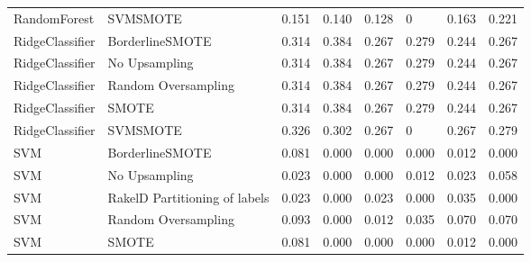 \begin{tabular}{llllllll}
                   RandomForest &                      SVMSMOTE & 0.151 &                     0.140 &                 0.128 &                      0 &                                   0.163 &     0.221 \\
                RidgeClassifier &               BorderlineSMOTE & 0.314 &                     0.384 &                 0.267 &                  0.279 &                                   0.244 &     0.267 \\
                RidgeClassifier &                 No Upsampling & 0.314 &                     0.384 &                 0.267 &                  0.279 &                                   0.244 &     0.267 \\
                RidgeClassifier &           Random Oversampling & 0.314 &                     0.384 &                 0.267 &                  0.279 &                                   0.244 &     0.267 \\
                RidgeClassifier &                         SMOTE & 0.314 &                     0.384 &                 0.267 &                  0.279 &                                   0.244 &     0.267 \\
                RidgeClassifier &                      SVMSMOTE & 0.326 &                     0.302 &                 0.267 &                      0 &                                   0.267 &     0.279 \\
                            SVM &               BorderlineSMOTE & 0.081 &                     0.000 &                 0.000 &                  0.000 &                                   0.012 &     0.000 \\
                            SVM &                 No Upsampling & 0.023 &                     0.000 &                 0.000 &                  0.012 &                                   0.023 &     0.058 \\
                            SVM & RakelD Partitioning of labels & 0.023 &                     0.000 &                 0.023 &                  0.000 &                                   0.035 &     0.000 \\
                            SVM &           Random Oversampling & 0.093 &                     0.000 &                 0.012 &                  0.035 &                                   0.070 &     0.070 \\
                            SVM &                         SMOTE & 0.081 &                     0.000 &                 0.000 &                  0.000 &                                   0.012 &     0.000 \\

\end{tabular}
